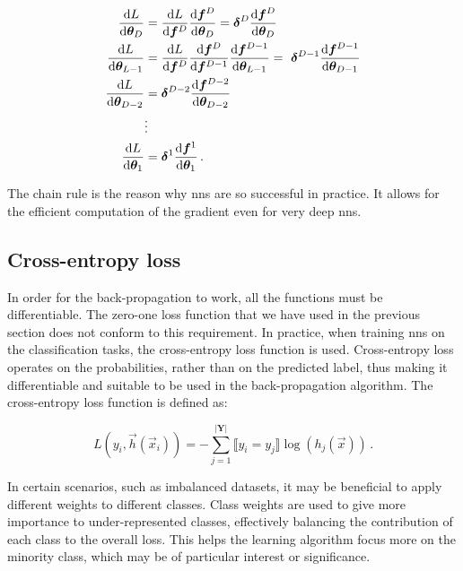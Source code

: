 \begin{align}
    \dv{L}{\nnparams_D}     & = \dv{L}{\vec{f}^D} \dv{\vec{f}^D}{\nnparams_{D}} = \vec{\delta}^D \dv{\vec{f}^D}{\nnparams_{D}} \\
    \dv{L}{\nnparams_{L-1}} & = \dv{L}{\vec{f}^D} \dv{\vec{f}^D}{\vec{f}^{D-1}} \dv{\vec{f}^{D-1}}{\nnparams_{L-1}} =\
    \vec{\delta}^{D-1} \dv{\vec{f}^{D-1}}{\nnparams_{D-1}}                                                                     \\
    \dv{L}{\nnparams_{D-2}} & = \vec{\delta}^{D-2} \dv{\vec{f}^{D-2}}{\nnparams_{D-2}}                                         \\
                            & \vdots \nonumber                                                                                 \\
    \dv{L}{\nnparams_{1}}   & = \vec{\delta}^1 \dv{\vec{f}^1}{\nnparams_{1}}\,.
\end{align}

The chain rule is the reason why \glspl{nn} are so successful in practice. It allows for the efficient computation of
the gradient even for very deep \glspl{nn}.






\subsection{Cross-entropy loss}
\label{sec:cross-entropy}

In order for the back-propagation to work, all the functions must be differentiable. The zero-one loss function that we
have used in the previous section does not conform to this requirement. In practice, when training \glspl{nn} on the
classification tasks, the cross-entropy loss function is used. Cross-entropy loss operates on the probabilities, rather
than on the predicted label, thus making it differentiable and suitable to be used in the back-propagation algorithm.
The cross-entropy loss function is defined as:

\begin{equation}
    \label{eq:no-weight}
    L(y_i, \vec{h}(\vec{x}_i)) = -\sum_{j = 1}^{|\textbf{Y}|} \llbracket y_i = y_j \rrbracket \log(h_j(\vec{x}))\,.
\end{equation}

In certain scenarios, such as imbalanced datasets, it may be beneficial to apply different weights to different classes.
Class weights are used to give more importance to under-represented classes, effectively balancing the contribution of
each class to the overall loss. This helps the learning algorithm focus more on the minority class, which may be of
particular interest or significance.

